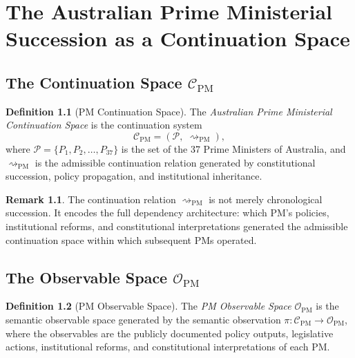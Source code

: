 \documentclass[12pt,anyside]{book}
\theoremstyle{plain}
\theoremstyle{definition}
\newtheorem{definition}{Definition}[chapter]
\newtheorem{remark}{Remark}[chapter]
\newcommand{\Ccal}{\mathcal{C}}        %
\newcommand{\Ocal}{\mathcal{O}}        %
\newcommand{\Pcal}{\mathcal{P}}        %
\newcommand{\PMset}{\{P_1, P_2, \ldots, P_{37}\}}
\begin{document}
\chapter{The Australian Prime Ministerial Succession as a Continuation Space}

\section{The Continuation Space $\Ccal_{\mathrm{PM}}$}

\begin{definition}[PM Continuation Space]\label{def:pmcont}
The \emph{Australian Prime Ministerial Continuation Space} is the continuation system
\[
\Ccal_{\mathrm{PM}} = (\Pcal,\; \rightsquigarrow_{\mathrm{PM}}),
\]
where $\Pcal = \PMset$ is the set of the 37 Prime Ministers of Australia, and $\rightsquigarrow_{\mathrm{PM}}$ is the admissible continuation relation generated by constitutional succession, policy propagation, and institutional inheritance.
\end{definition}

\begin{remark}
The continuation relation $\rightsquigarrow_{\mathrm{PM}}$ is not merely chronological succession. It encodes the full dependency architecture: which PM's policies, institutional reforms, and constitutional interpretations generated the admissible continuation space within which subsequent PMs operated.
\end{remark}

\section{The Observable Space $\Ocal_{\mathrm{PM}}$}

\begin{definition}[PM Observable Space]\label{def:pmobs}
The \emph{PM Observable Space} $\Ocal_{\mathrm{PM}}$ is the semantic observable space generated by the semantic observation $\pi: \Ccal_{\mathrm{PM}} \to \Ocal_{\mathrm{PM}}$, where the observables are the publicly documented policy outputs, legislative actions, institutional reforms, and constitutional interpretations of each PM.
\end{definition}

\end{document}
